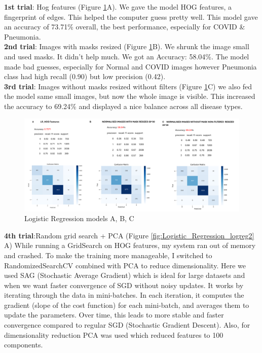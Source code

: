 \documentclass{article}
\begin{document}
\textbf{1st trial}: Hog features (Figure \ref{fig:Logistic_Regression}A). We gave the model HOG features, a fingerprint of edges. This helped the computer guess pretty well.
This model gave an accuracy of 73.71\% overall, the best performance, especially for COVID \& Pneumonia.
\\
\textbf{2nd trial}: Images with masks resized (Figure \ref{fig:Logistic_Regression}B). We shrunk the image small and used masks. It didn’t help much.
We got an Accuracy: 58.04\%. The model made bad guesses, especially for Normal and COVID images however Pneumonia class had high recall (0.90) but low precision (0.42).
\\
\textbf{3rd trial}: Images without masks resized without filters (Figure \ref{fig:Logistic_Regression}C) we also fed the model same small images, but now the whole image is visible. This increased the accuracy to 69.24\%  and displayed a nice balance across all disease types.
\\
\begin{figure}[H] %
    \centering
    \includegraphics[width=1.0\linewidth]{lr1,2,3.png}
    \caption{Logistic Regression models A, B, C}
    \label{fig:Logistic_Regression}
\end{figure}
\textbf{4th trial}:Random grid search + PCA (Figure \ref{fig:Logistic_Regression_logreg2} A)
While running a GridSearch on HOG features, my system ran out of memory and crashed. To make the training more manageable, I switched to RandomizedSearchCV combined with PCA to reduce dimensionality.
Here we used SAG (Stochastic Average Gradient) which is ideal for large datasets and when we want faster convergence of SGD without noisy updates. It works by iterating through the data in mini-batches. In each iteration, it computes the gradient (slope of the cost function) for each mini-batch, and averages them to update the parameters. Over time, this leads to more stable and faster convergence compared to regular SGD (Stochastic Gradient Descent). Also, for dimensionality reduction PCA was used which reduced features to 100 components.
\end{document}
